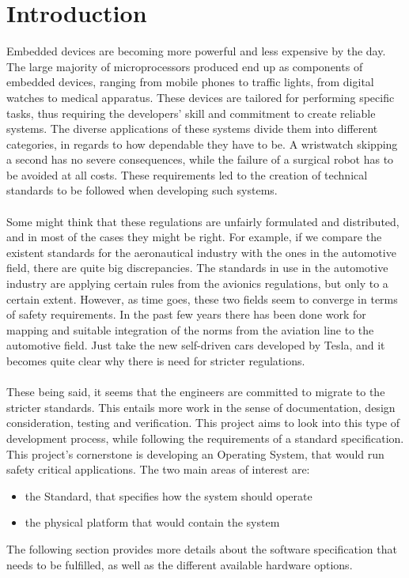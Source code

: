 \chapter{Introduction}\label{ch:introduction} 

Embedded devices are becoming more powerful and less expensive by the day. The large majority of
microprocessors produced end up as components of embedded devices, ranging from mobile phones
to traffic lights, from digital watches to medical apparatus. These devices are tailored for 
performing specific tasks, thus requiring the developers' skill and commitment to create reliable
systems. The diverse applications of these systems divide them into different categories, in regards to
how dependable they have to be. A wristwatch skipping a second has no severe consequences, while the
failure of a surgical robot has to be avoided at all costs. These requirements led to the creation 
of technical standards to be followed when developing such systems. 
\\\\
Some might think that these regulations are unfairly formulated and distributed, and in most
of the cases they might be right. For example, if we compare the existent standards for the aeronautical industry with the ones in the automotive field, there are quite big discrepancies. The standards 
in use in the automotive industry are applying certain rules from the avionics regulations, 
but only to a certain extent.
However, as time goes, these two fields seem to converge in terms of safety requirements. 
In the past few years there has been done work for mapping and suitable integration 
of the norms from the aviation line to the automotive field. Just take the new self-driven 
cars developed by Tesla, and it becomes quite clear why there is need for stricter regulations. 
\\\\
These being said, it seems that the engineers are committed to migrate to the stricter standards. 
This entails more work in the sense of documentation, design consideration, testing and verification.
This project aims to look into this type of development process, while following the requirements 
of a standard specification.
This project's cornerstone is developing an Operating System, that would run safety critical 
applications. The two main areas of interest are:
\begin{itemize}
\item the Standard, that specifies how the system should operate
\item the physical platform that would contain the system
\end{itemize}
The following section provides more details about the software specification that needs to be fulfilled, as well as the different available hardware options.




